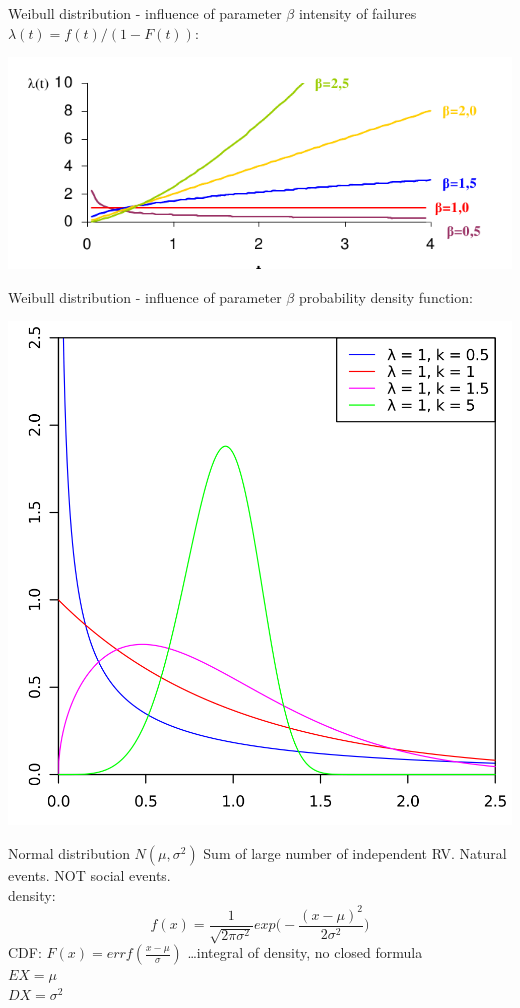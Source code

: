 \documentclass[smaller]{beamer}
\begin{document}
\begin{frame}{Weibull distribution - influence of parameter $\beta$}
intensity of failures $\lambda(t) = f(t)/(1-F(t))$:
 \begin{center}
 \includegraphics[scale=0.7]{./04_weibull_intenzita.png}
\end{center}
\end{frame}

\begin{frame}{Weibull distribution - influence of parameter $\beta$}
probability density function:
\begin{center}
 \includegraphics[scale=0.2]{./04_weibull_density.png}
\end{center}
\end{frame}

\begin{frame}{Normal distribution $N(\mu, \sigma^2)$}
Sum of large number of independent RV. Natural events. NOT social events.\\
density:
\[
 f(x) = \frac{1}{\sqrt{2\pi \sigma^2}} exp\Big( - \frac{ (x - \mu)^2}{2\sigma^2} \Big)
\]
CDF: $F(x) = errf(\frac{x-\mu}{\sigma})$ \dots integral of density, no closed formula\\
\vspace{2ex}
$EX = \mu$\\
$DX = \sigma^2$

\end{frame}
\end{document}
